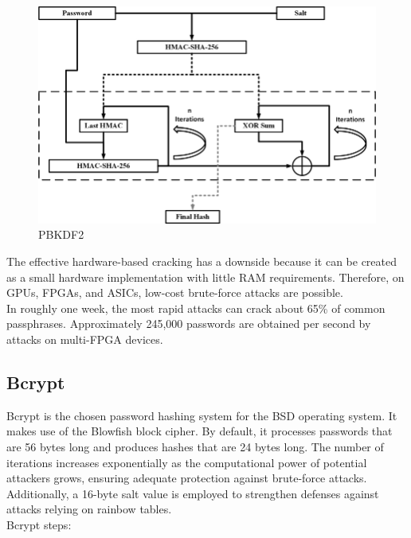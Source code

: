 \documentclass[10pt,oneside,english,a4paper]{article}
\begin{document}
\begin{figure}[h!]
	\centering
	\includegraphics[scale = 0.40]{PBKDF2.png}
	\caption{PBKDF2}
	\label{}
\end{figure}

The effective hardware-based cracking has a downside because it can be created as a small hardware implementation with little RAM requirements. Therefore, on GPUs, FPGAs, and ASICs, low-cost brute-force attacks are possible. \\
In roughly one week, the most rapid attacks can crack about 65\% of common passphrases. Approximately 245,000 passwords are obtained per second by attacks on multi-FPGA devices.

\subsection{Bcrypt}
Bcrypt is the chosen password hashing system for the BSD operating system. It makes use of the Blowfish block cipher. By default, it processes passwords that are 56 bytes long and produces hashes that are 24 bytes long. The number of iterations increases exponentially as the computational power of potential attackers grows, ensuring adequate protection against brute-force attacks. Additionally, a 16-byte salt value is employed to strengthen defenses against attacks relying on rainbow tables. \\
Bcrypt steps:
\end{document}
